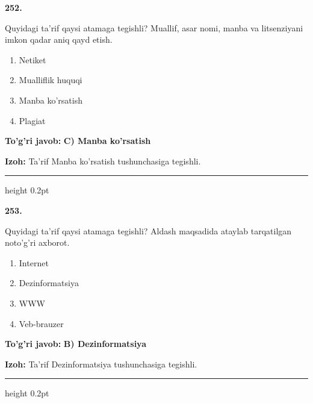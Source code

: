 \documentclass[10pt,a4paper,oneside]{article}
\begin{document}
\noindent\textbf{\color{ink}252.}
\par
Quyidagi ta'rif qaysi atamaga tegishli? Muallif, asar nomi, manba va litsenziyani imkon qadar aniq qayd etish.
\begin{enumerate}[label=\Alph*),leftmargin=9mm]
\item Netiket
\item Mualliflik huquqi
\item Manba ko'rsatish
\item Plagiat
\end{enumerate}
\begin{tcolorbox}[enhanced,breakable,colback=teal!4,colframe=teal!50!black,boxrule=0.5pt,arc=1.1mm,left=3mm,right=3mm,top=1.7mm,bottom=1.7mm,before skip=2mm,after skip=2mm]
\textbf{\color{teal}To'g'ri javob:} \textbf{C) Manba ko'rsatish}
\par\smallskip
\textbf{Izoh:} Ta'rif Manba ko'rsatish tushunchasiga tegishli.
\end{tcolorbox}
\vspace{2mm}\hrule height 0.2pt \vspace{3mm}

\noindent\textbf{\color{ink}253.}
\par
Quyidagi ta'rif qaysi atamaga tegishli? Aldash maqsadida ataylab tarqatilgan noto'g'ri axborot.
\begin{enumerate}[label=\Alph*),leftmargin=9mm]
\item Internet
\item Dezinformatsiya
\item WWW
\item Veb-brauzer
\end{enumerate}
\begin{tcolorbox}[enhanced,breakable,colback=teal!4,colframe=teal!50!black,boxrule=0.5pt,arc=1.1mm,left=3mm,right=3mm,top=1.7mm,bottom=1.7mm,before skip=2mm,after skip=2mm]
\textbf{\color{teal}To'g'ri javob:} \textbf{B) Dezinformatsiya}
\par\smallskip
\textbf{Izoh:} Ta'rif Dezinformatsiya tushunchasiga tegishli.
\end{tcolorbox}
\vspace{2mm}\hrule height 0.2pt \vspace{3mm}
\end{document}
